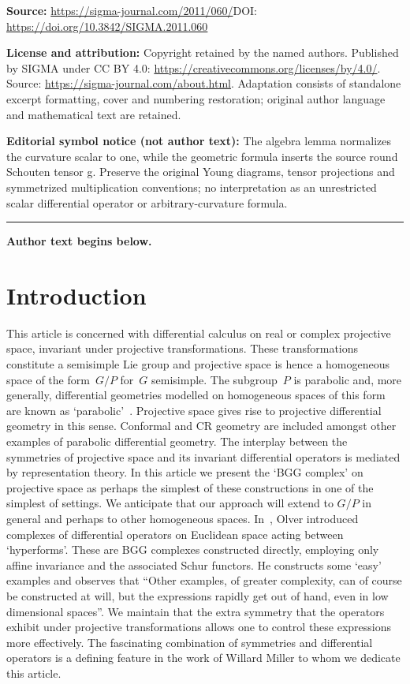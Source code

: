 \documentclass[11pt]{article}
\begin{document}
\noindent\textbf{Source:} \url{https://sigma-journal.com/2011/060/}\quad DOI: \url{https://doi.org/10.3842/SIGMA.2011.060}\par
\noindent\textbf{License and attribution:} Copyright retained by the named authors. Published by SIGMA under CC BY 4.0: \url{https://creativecommons.org/licenses/by/4.0/}. Source: \url{https://sigma-journal.com/about.html}. Adaptation consists of standalone excerpt formatting, cover and numbering restoration; original author language and mathematical text are retained.\par
\noindent\textbf{Editorial symbol notice (not author text):} The algebra lemma normalizes the curvature scalar to one, while the geometric formula inserts the source round Schouten tensor g. Preserve the original Young diagrams, tensor projections and symmetrized multiplication conventions; no interpretation as an unrestricted scalar differential operator or arbitrary-curvature formula.\par
\medskip\hrule\medskip\noindent\textbf{Author text begins below.}\par
\setcounter{section}{0}
\setcounter{subsection}{0}
\setcounter{subsubsection}{0}
\setcounter{equation}{0}
\section{Introduction}
This article is concerned with dif\/ferential calculus on real or complex
projective space, in\-variant under projective transformations. These
transformations constitute a semisimple Lie group and projective space is hence
a homogeneous space of the form~$G/P$ for~$G$ semisimple. The subgroup~$P$ is
parabolic and, more generally, dif\/ferential geometries modelled on homogeneous
spaces of this form are known as `parabolic'~\cite{thebook}. Projective space
gives rise to projective dif\/ferential geometry in this sense. Conformal and CR
geometry are included amongst other examples of parabolic dif\/ferential
geometry. The interplay between the symmetries of projective space and its
invariant dif\/ferential operators is mediated by representation theory. In this
article we present the `BGG complex' on projective space as perhaps the
simplest of these constructions in one of the simplest of settings. We
anticipate that our approach will extend to $G/P$ in general and perhaps to
other homogeneous spaces. In~\cite{o}, Olver introduced complexes of
dif\/ferential operators on Euclidean space acting between `hyperforms'. These
are BGG complexes constructed directly, employing only af\/f\/ine invariance and
the associated Schur functors. He constructs some `easy' examples and observes
that ``Other examples, of greater complexity, can of course be constructed at
will, but the expressions rapidly get out of hand, even in low dimensional
spaces''. We maintain that the extra symmetry that the operators exhibit under
projective transformations allows one to control these expressions more
ef\/fectively. The fascinating combination of symmetries and dif\/ferential
operators is a def\/ining feature in the work of Willard Miller to whom we
dedicate this article.
\end{document}
